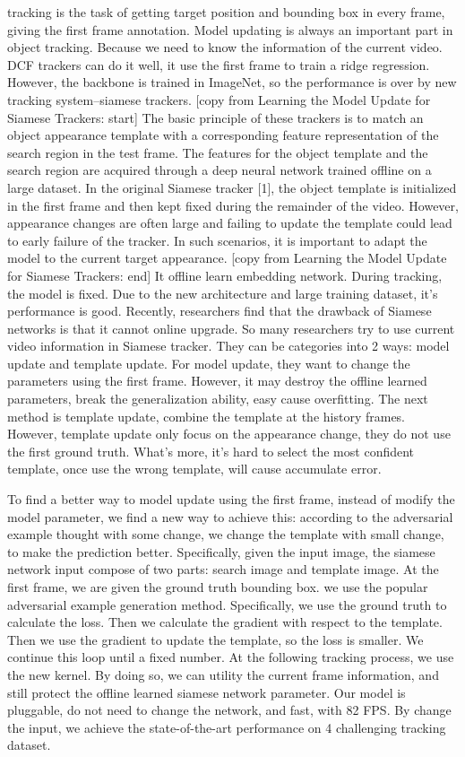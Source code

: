 \documentclass[journal]{IEEEtran}
\begin{document}
 tracking is the task of getting target position and bounding box in every frame, giving the first frame annotation. Model updating is always an important part in object tracking. Because we need to know the information of the current video. DCF trackers can do it well, it use the first frame to train a ridge regression. However, the backbone is trained in ImageNet, so the performance is over by new tracking system--siamese trackers. 
[copy from Learning the Model Update for Siamese Trackers: start]
The basic principle of these trackers is to match an object appearance template with a corresponding feature representation of the search region in the test frame. The features for the object template and the search region are
acquired through a deep neural network trained offline on a large dataset.
In the original Siamese tracker [1], the object template is initialized in the first frame and then kept fixed during the remainder of the video. However, appearance changes are often large and failing to update the template could lead to early failure of the tracker. In such scenarios, it is important to adapt the model to the current target appearance.
[copy from Learning the Model Update for Siamese Trackers: end]
It offline learn embedding network. During tracking, the model is fixed. Due to the new architecture and large training dataset, it's performance is good. Recently, researchers find that the drawback of Siamese networks is that it cannot online upgrade. So many researchers try to use current video information in Siamese tracker. They can be categories into 2 ways: model update and template update. For model update, they want to change the parameters using the first frame. However, it may destroy the offline learned parameters, break the generalization ability, easy cause overfitting. The next method is template update, combine the template at the history frames. However, template update only focus on the appearance change, they do not use the first ground truth. What's more, it's hard to select the most confident template, once use the wrong template, will cause accumulate error.

To find a better way to model update using the first frame, instead of modify the model parameter, we find a new way to achieve this: according to the adversarial example thought with some change, we change the template with small change, to make the prediction better.
Specifically, given the input image, the siamese network input compose of two parts: search image and template image. At the first frame, we are given the ground truth bounding box. we use the popular adversarial example generation method. Specifically, we use the ground truth to calculate the loss. Then we calculate the gradient with respect to the template.
Then we use the gradient to update the template, so the loss is smaller. We continue this loop until a fixed number.
At the following tracking process, we use the new kernel. By doing so, we can utility the current frame information, and still protect the offline learned siamese network parameter.
Our model is pluggable, do not need to change the network, and fast, with 82 FPS.
By change the input, we achieve the state-of-the-art performance on 4 challenging tracking dataset.
\end{document}
